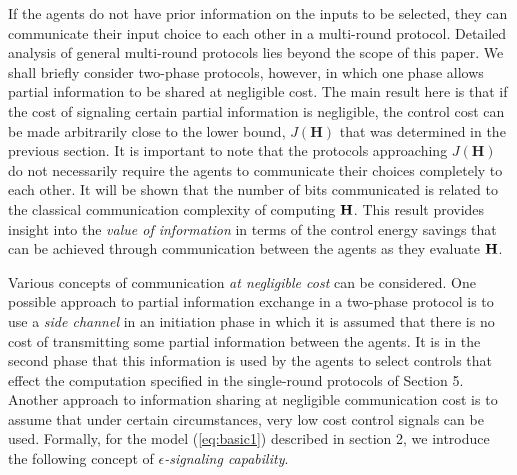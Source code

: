 \documentclass[12pt,onecolumn,draftcls]{IEEEtran}
\newcommand{\bH}{\mathbf{H}}
\begin{document}
If the agents do not have prior information on the inputs to be selected, they can
communicate their input choice to each other in a multi-round protocol.
Detailed analysis of general multi-round protocols lies beyond the scope of this paper.  We shall briefly consider two-phase protocols, however, in which one phase allows partial information to be shared at negligible cost.  The main result here is that if the cost of signaling certain partial information is negligible, the control cost can be made arbitrarily
close to the lower bound, $J(\bH)$ that was determined in the previous section.   It is important to note that the protocols approaching $J(\bH)$ do not necessarily
require the agents to communicate their choices completely to each other.  It will be shown that the number of bits communicated is related to the classical communication complexity of computing $\bf H$.  This result provides insight into the {\em value of information} in terms of the control energy savings that can be achieved through communication between the agents as they evaluate $\bf H$.

Various concepts of communication {\em at negligible cost} can be considered.  One possible approach to partial information exchange in a two-phase protocol is to use a {\em side channel} in an initiation phase in which it is assumed that there is no cost of transmitting some partial information between the agents.  It is in the second phase that  this information is used by the agents to select controls that effect the computation specified in the single-round protocols of Section 5.  Another approach to information sharing at negligible communication cost is to assume that under certain circumstances, very low cost control signals can be used.  Formally, 
for the model (\ref{eq:basic1}) described in section 2, we introduce the following concept of
{\em $\epsilon$-signaling capability}.
\end{document}
